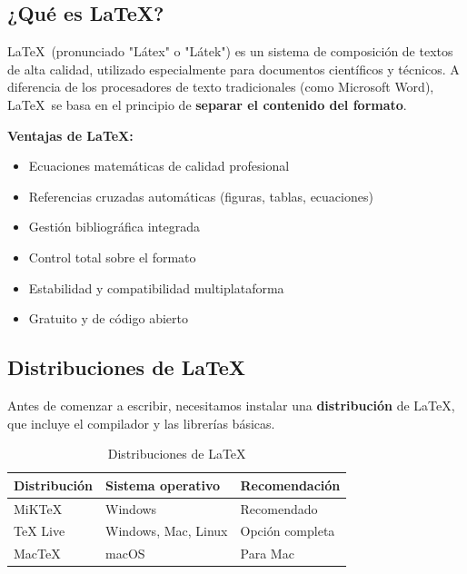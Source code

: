 \documentclass[11pt,letterpaper]{article}
\begin{document}
	\subsection{¿Qué es \LaTeX?}
	
	\LaTeX \ (pronunciado "Látex" o "Látek") es un sistema de composición de textos de alta calidad, utilizado especialmente para documentos científicos y técnicos. A diferencia de los procesadores de texto tradicionales (como Microsoft Word), \LaTeX \ se basa en el principio de \textbf{separar el contenido del formato}.
	
	\begin{cajateoria}
		\textbf{Ventajas de \LaTeX:}
		\begin{itemize}
			\item Ecuaciones matemáticas de calidad profesional
			\item Referencias cruzadas automáticas (figuras, tablas, ecuaciones)
			\item Gestión bibliográfica integrada
			\item Control total sobre el formato
			\item Estabilidad y compatibilidad multiplataforma
			\item Gratuito y de código abierto
		\end{itemize}
	\end{cajateoria}
	
	\subsection{Distribuciones de \LaTeX}
	
	Antes de comenzar a escribir, necesitamos instalar una \textbf{distribución} de \LaTeX, que incluye el compilador y las librerías básicas.
	
	\begin{table}[H]
		\centering
		\begin{tabular}{@{}lll@{}}
			\toprule
			\textbf{Distribución} & \textbf{Sistema operativo} & \textbf{Recomendación} \\
			\midrule
			MiKTeX & Windows & \faCheckSquare Recomendado \\
			TeX Live & Windows, Mac, Linux & Opción completa \\
			MacTeX & macOS & Para Mac \\
			\bottomrule
		\end{tabular}
		\caption{Distribuciones de \LaTeX}
		\label{tab:distribuciones}
	\end{table}
	
\end{document}
